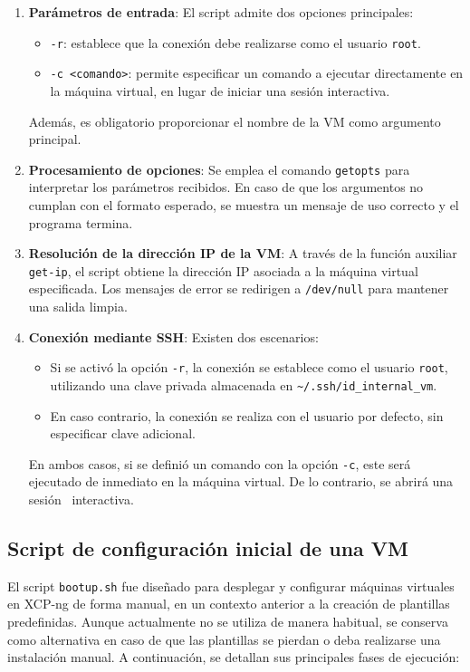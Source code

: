\begin{enumerate}
    \item \textbf{Parámetros de entrada}:  
    El script admite dos opciones principales:
    \begin{itemize}
        \item \texttt{-r}: establece que la conexión debe realizarse como el usuario \texttt{root}.
        \item \texttt{-c <comando>}: permite especificar un comando a ejecutar directamente en la máquina virtual, en lugar de iniciar una sesión interactiva.
    \end{itemize}
    Además, es obligatorio proporcionar el nombre de la VM como argumento principal.

    \item \textbf{Procesamiento de opciones}:  
    Se emplea el comando \texttt{getopts} para interpretar los parámetros recibidos. En caso de que los argumentos no cumplan con el formato esperado, se muestra un mensaje de uso correcto y el programa termina.

    \item \textbf{Resolución de la dirección IP de la VM}:  
    A través de la función auxiliar \texttt{get-ip}, el script obtiene la dirección IP asociada a la máquina virtual especificada. Los mensajes de error se redirigen a \texttt{/dev/null} para mantener una salida limpia.

    \item \textbf{Conexión mediante SSH}:  
    Existen dos escenarios:
    \begin{itemize}
        \item Si se activó la opción \texttt{-r}, la conexión se establece como el usuario \texttt{root}, utilizando una clave privada almacenada en \texttt{\~{}/.ssh/id\_internal\_vm}.
        \item En caso contrario, la conexión se realiza con el usuario por defecto, sin especificar clave adicional.
    \end{itemize}
    En ambos casos, si se definió un comando con la opción \texttt{-c}, este será ejecutado de inmediato en la máquina virtual. De lo contrario, se abrirá una sesión \SSH\ interactiva.

\end{enumerate}



\subsection{Script de configuración inicial de una VM}
\noindent
El script \texttt{bootup.sh} fue diseñado para desplegar y configurar máquinas virtuales en XCP-ng de forma manual, en un contexto anterior a la creación de plantillas predefinidas. Aunque actualmente no se utiliza de manera habitual, se conserva como alternativa en caso de que las plantillas se pierdan o deba realizarse una instalación manual. A continuación, se detallan sus principales fases de ejecución:

